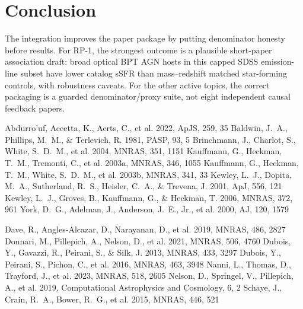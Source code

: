 \documentclass[twocolumn]{aastex631}
\begin{document}
\section{Conclusion}\label{sec:conclusion}
The integration improves the paper package by putting denominator honesty before results. For RP-1, the strongest outcome is a plausible short-paper association draft: broad optical BPT AGN hosts in this capped SDSS emission-line subset have lower catalog sSFR than mass--redshift matched star-forming controls, with robustness caveats. For the other active topics, the correct packaging is a guarded denominator/proxy suite, not eight independent causal feedback papers.


\begin{thebibliography}{}
 Abdurro'uf, Accetta, K., Aerts, C., et al. 2022, ApJS, 259, 35
 Baldwin, J.~A., Phillips, M.~M., \& Terlevich, R. 1981, PASP, 93, 5
 Brinchmann, J., Charlot, S., White, S.~D.~M., et al. 2004, MNRAS, 351, 1151
 Kauffmann, G., Heckman, T.~M., Tremonti, C., et al. 2003a, MNRAS, 346, 1055
 Kauffmann, G., Heckman, T.~M., White, S.~D.~M., et al. 2003b, MNRAS, 341, 33
 Kewley, L.~J., Dopita, M.~A., Sutherland, R.~S., Heisler, C.~A., \& Trevena, J. 2001, ApJ, 556, 121
 Kewley, L.~J., Groves, B., Kauffmann, G., \& Heckman, T. 2006, MNRAS, 372, 961
 York, D.~G., Adelman, J., Anderson, J.~E., Jr., et al. 2000, AJ, 120, 1579

 Dave, R., Angles-Alcazar, D., Narayanan, D., et al. 2019, MNRAS, 486, 2827
 Donnari, M., Pillepich, A., Nelson, D., et al. 2021, MNRAS, 506, 4760
 Dubois, Y., Gavazzi, R., Peirani, S., \& Silk, J. 2013, MNRAS, 433, 3297
 Dubois, Y., Peirani, S., Pichon, C., et al. 2016, MNRAS, 463, 3948
 Nanni, L., Thomas, D., Trayford, J., et al. 2023, MNRAS, 518, 2605
 Nelson, D., Springel, V., Pillepich, A., et al. 2019, Computational Astrophysics and Cosmology, 6, 2
 Schaye, J., Crain, R.~A., Bower, R.~G., et al. 2015, MNRAS, 446, 521
\end{thebibliography}
\end{document}
